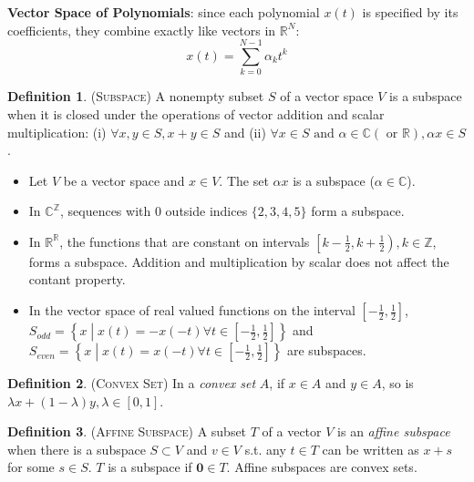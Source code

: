 \documentclass[9pt, twocolumn]{extarticle}
\theoremstyle{definition}
\newtheorem{definition}{Definition}
\begin{document}
\noindent \textbf{Vector Space of Polynomials}: since each polynomial $x(t)$ is specified by its coefficients, they combine exactly like vectors in $ \mathds{R}^N $:\vspace{-0.3cm}
\[x(t) = \sum_{k=0}^{N-1}\alpha_kt^k\]

\begin{definition}{(\textsc{Subspace})}
  A nonempty subset $S$ of a vector space $V$ is a subspace when it is closed under the operations of vector addition and scalar multiplication: (i) $\forall x,y \in S, x+y\in S$ and (ii) $\forall x \in S \text{ and } \alpha\in \mathds{C}(\text{ or }\mathds{R}), \alpha x \in S$.
\end{definition}

\begin{itemize}
  \item Let $V$ be a vector space and $x\in V$. The set $\alpha x$ is a subspace ($ \alpha\in\mathds{C} $).
  \item In $ \mathds{C}^\mathds{Z} $, sequences with 0 outside indices $ \{2,3,4,5\} $ form a subspace.
  \item In $ \mathds{R}^\mathds{R} $, the functions that are constant on intervals $ \left[k-\frac{1}{2},k+\frac{1}{2}\right), k\in\mathds{Z} $, forms a subspace. Addition and multiplication by scalar does not affect the contant property.
  \item In the vector space of real valued functions on the interval $ \left[-\frac{1}{2},\frac{1}{2}\right] $,\\ $S_{odd}=\left\{x\middle|x(t)=-x(-t)\forall t\in\left[-\frac{1}{2},\frac{1}{2}\right]\right\}$ and\\ $S_{even}=\left\{x\middle|x(t)=x(-t)\forall t\in\left[-\frac{1}{2},\frac{1}{2}\right]\right\}$ are subspaces.
\end{itemize}

\begin{definition}{(\textsc{Convex Set})}
  In a \emph{convex set} $A$, if $x\in A$ and $y\in A$, so is $\lambda x + (1-\lambda)y, \lambda \in [0,1]$.
\end{definition}

\begin{definition}{(\textsc{Affine Subspace})}
  A subset $T$ of a vector $V$ is an \emph{affine subspace} when there is a subspace $S\subset V$ and $v\in V$ s.t. any $ t\in T $ can be written as $x+s$ for some $s\in S$. $T$ is a subspace if $\textbf{0}\in T$. Affine subspaces are convex sets.
\end{definition}
\end{document}
